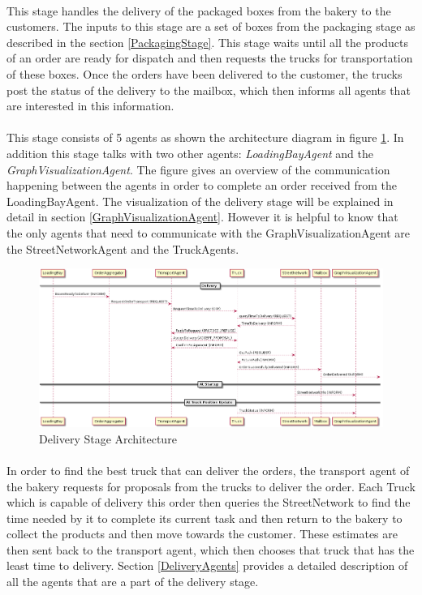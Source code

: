 \documentclass[11pt, a4paper]{article}
\begin{document}
\paragraph{}
This stage handles the delivery of the packaged boxes from the bakery to the customers. The inputs to this stage are a set of boxes from the packaging stage as described in the section \ref{PackagingStage}. This stage waits until all the products of an order are ready for dispatch and then requests the trucks for transportation of these boxes. Once the orders have been delivered to the customer, the trucks post the status of the delivery to the mailbox, which then informs all agents that are interested in this information.

\paragraph{}
This stage consists of 5 agents as shown the architecture diagram in figure \ref{DeliveryArchitecture}. In addition this stage talks with two other agents: \textit{LoadingBayAgent} and the \textit{GraphVisualizationAgent}. The figure gives an overview of the communication happening between the agents in order to complete an order received from the LoadingBayAgent. The visualization of the delivery stage will be explained in detail in section \ref{GraphVisualizationAgent}. However it is helpful to know that the only agents that need to communicate with the GraphVisualizationAgent are the StreetNetworkAgent and the TruckAgents. 

\begin{figure}[h!]
	\centering
	\includegraphics[width=\textwidth]{../Architecture/Architecture_Delivery.png}
	\caption{Delivery Stage Architecture}
	\label{DeliveryArchitecture}
\end{figure}

\paragraph{}
In order to find the best truck that can deliver the orders, the transport agent of the bakery requests for proposals from the trucks to deliver the order. Each Truck which is capable of delivery this order then queries the StreetNetwork to find the time needed by it to complete its current task and then return to the bakery to collect the products and then move towards the customer. These estimates are then sent back to the transport agent, which then chooses that truck that has the least time to delivery.  Section \ref{DeliveryAgents} provides a detailed description of all the agents that are a part of the delivery stage.
\end{document}
